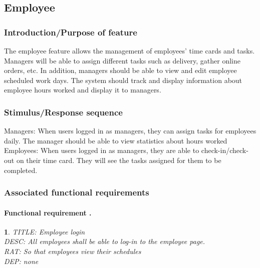\documentclass{scrreprt}
\theoremstyle{funreq}
\newtheorem{funreq}{}
\begin{document}
	
	\subsection{Employee}
	\subsubsection{Introduction/Purpose of feature}
	The employee feature allows the management of employees’ time cards and tasks. Managers will be able to assign different tasks such as delivery, gather online orders, etc.  In addition, managers should be able to view and edit employee scheduled work days.  The system should track and display information about employee hours worked and display it to managers.
	
	
	\subsubsection{Stimulus/Response sequence}
	Managers:
	When users logged in as managers, they can assign tasks for employees daily.  The manager should be able to view statistics about hours worked
	Employees:
	When users logged in as managers, they are able to check-in/check-out on their time card. They will see the tasks assigned for them to be completed.
	
	\subsubsection{Associated functional requirements}
	\paragraph[]{Functional requirement .}
	\begin{funreq}
		\label{employee_login}
		TITLE: Employee login\\
		DESC: All employees shall be able to log-in to the employee page.\\
		RAT: So that employees view their schedules\\
		DEP: none
	\end{funreq}
	
\end{document}
